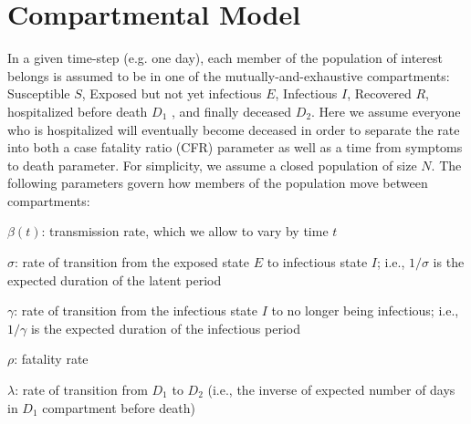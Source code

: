 \documentclass[11pt]{amsart}
\newenvironment{packed_item}{
\begin{itemize}
 \setlength{\itemsep}{0pt}
  \setlength{\parskip}{0pt}
  \setlength{\parsep}{0pt}
}{\end{itemize}}
\begin{document}
 \section{Compartmental Model}
% 
% 
In a given time-step (e.g. one day), each member of the population of  interest belongs is assumed to be in one of the mutually-and-exhaustive compartments:
 Susceptible $S$, Exposed but not yet infectious $E$, Infectious $I$, Recovered $R$, hospitalized before death $D_1$ , and finally deceased $D_2$. Here we assume everyone who is hospitalized will eventually become deceased in order to separate the rate into both a case fatality ratio (CFR) parameter as well as a time from symptoms to death parameter.    For simplicity, we assume a closed population of size $N$. 
The following parameters govern how members of the population move between compartments:  
\begin{packed_item}
\item $\beta(t)$: transmission rate, which we allow to vary by time $t$
\item $\sigma$: rate of transition from the exposed state $E$ to infectious state $I$; i.e., $1/\sigma$ is the expected duration of the latent period
\item $\gamma$: rate of transition from  the infectious state $I$ to no longer being infectious; i.e., $1/\gamma$ is the expected duration of the infectious period
\item $\rho$: fatality rate %
\item $\lambda$: rate of transition from $D_1$ to $D_2$ 
(i.e., the inverse of expected number of days in $D_1$ compartment before death) 
\end{packed_item}
\end{document}
